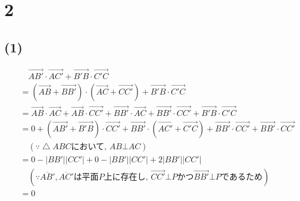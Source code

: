\documentclass[a4j, 11pt]{jarticle}
\begin{document}
%
%

%
%
\section*{2}
\subsection*{(1)}
\begin{align*}
	&\quad \overrightarrow{AB'} \cdot \overrightarrow{AC'}
	+ \overrightarrow{B'B} \cdot \overrightarrow{C'C} \\
	&= (\overrightarrow{AB} + \overrightarrow{BB'})
	\cdot (\overrightarrow{AC} + \overrightarrow{CC'})
	+ \overrightarrow{B'B} \cdot \overrightarrow{C'C} \\
	&= \overrightarrow{AB} \cdot \overrightarrow{AC}
	+ \overrightarrow{AB} \cdot \overrightarrow{CC'}
	+ \overrightarrow{BB'} \cdot \overrightarrow{AC}
	+ \overrightarrow{BB'} \cdot \overrightarrow{CC'}
	+ \overrightarrow{B'B} \cdot \overrightarrow{C'C} \\
	&= 0 + (\overrightarrow{AB'} + \overrightarrow{B'B}) \cdot
	\overrightarrow{CC'}
	+ \overrightarrow{BB'} \cdot
	(\overrightarrow{AC'} + \overrightarrow{C'C})
	+ \overrightarrow{BB'} \cdot \overrightarrow{CC'}
	+ \overrightarrow{BB'} \cdot \overrightarrow{CC'} \\
		&\quad (\because \bigtriangleup ABC \text{において, } AB \bot AC) \\
	&= 0 - |BB'| |CC'| + 0 - |BB'| |CC'| + 2 |BB'| |CC'| \\
		&\quad (\because \overline{AB'}, \overline{AC'}
		\text{は平面} P \text{上に存在し, }
		\overrightarrow{CC'} \bot P \text{かつ}
		\overrightarrow{BB'} \bot P \text{であるため} )\\
	&= 0
\end{align*}
\end{document}
